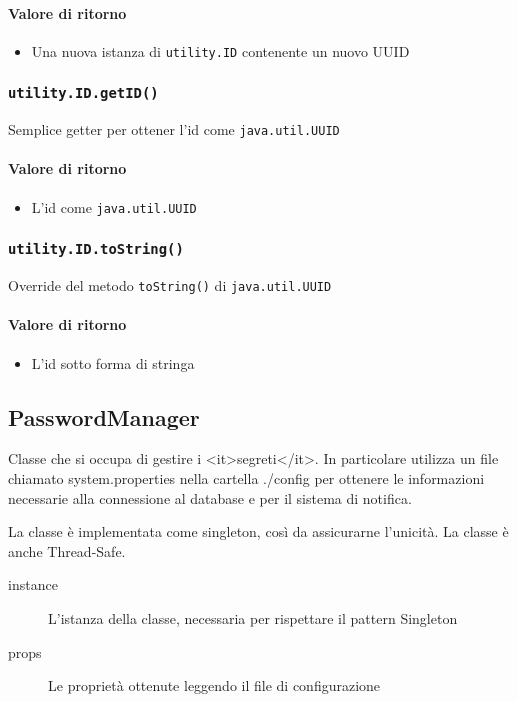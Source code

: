 \paragraph{Valore di ritorno}
\begin{itemize}
\item Una nuova istanza di \texttt{utility.ID} contenente un nuovo UUID
\end{itemize}

\subsubsection{\texttt{utility.ID.getID()}}
Semplice getter per ottener l'id come \texttt{java.util.UUID}

\paragraph{Valore di ritorno}
\begin{itemize}
\item L'id come \texttt{java.util.UUID}
\end{itemize}

\subsubsection{\texttt{utility.ID.toString()}}
Override del metodo \texttt{toString()} di \texttt{java.util.UUID}
\paragraph{Valore di ritorno}
\begin{itemize}
\item L'id sotto forma di stringa
\end{itemize}


\subsection{PasswordManager}
Classe che si occupa di gestire i <it>segreti</it>. In particolare
utilizza un file chiamato system.properties nella cartella ./config
per ottenere le informazioni necessarie alla connessione al database e
per il sistema di notifica.
 
La classe è implementata come singleton, così da assicurarne
l'unicità.  La classe è anche Thread-Safe.

\begin{description}
\item[instance] L'istanza della classe, necessaria per rispettare il pattern Singleton
\item[props] Le proprietà ottenute leggendo il file di configurazione
\end{description}

